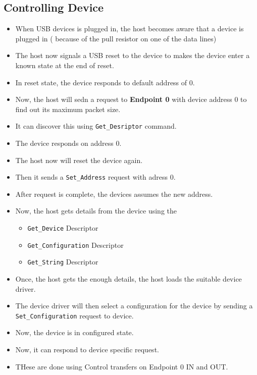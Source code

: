\documentclass{article}
\begin{document}
\subsection{Controlling Device}
\begin{itemize}
    \item When USB devices is plugged in, the host becomes aware that a device is plugged in ( because of the pull resistor on one of the data lines)
    \item The host now signals a USB reset to the device to makes the device enter a known state at the end of reset.
    \item In reset state, the device responds to default address of 0.
    \item Now, the host will sedn a request to \textbf{Endpoint 0} with device address 0 to find out its maximum packet size.
    \item It can discover this using \verb|Get_Desriptor| command.
    \item The device responds on address 0.
    \item The host now will reset the device again.
    \item Then it sends a \verb|Set_Address| request with adress 0.
    \item After request is complete, the devices assumes the new address.
    \item Now, the host gets details from the device using the
          \begin{itemize}
              \item \verb|Get_Device| Descriptor
              \item \verb|Get_Configuration| Descriptor
              \item \verb|Get_String| Descriptor
          \end{itemize}
    \item Once, the host gets the enough details, the host loads the suitable device driver.
    \item The device driver will then select a configuration for the device by sending a \verb|Set_Configuration| request to device.
    \item Now, the device is in configured state.
    \item Now, it can respond to device specific request.
    \item THese are done using Control transfers on Endpoint 0 IN and OUT.
\end{itemize}
\end{document}
